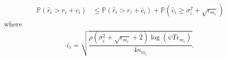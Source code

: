 \begin{customproof}{1}
\begin{align}
\mathbb{P}(\hat{r}_{i}> r_{i} + c_{i})
&\leq \mathbb{P}\left( \hat{r}_{i} > r_{i}+ \bar{c}_i\right) 
+ \mathbb{P}\left( \hat{v}_{i}\geq \sigma_{i}^{2}+\sqrt{\epsilon_{m_{i}}}\right)\label{eq:prob_eq2}
\end{align}
where 
\begin{align*}
\bar{c}_i=\sqrt{\dfrac{\rho (\sigma_{i}^{2}+\sqrt{\epsilon_{m_{i}}} + 2)\log(\psi T\epsilon_{m_{i}})}{4n_{m_i}}}.
\end{align*}

%
% 

\end{customproof}
